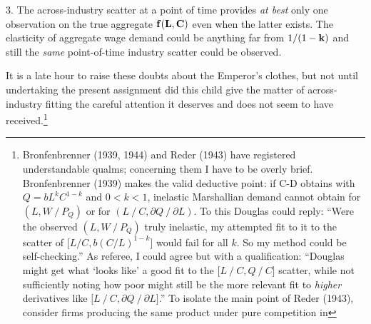 \documentclass{article}
\begin{document}
3. The across-industry scatter at a point of time provides \emph{at best} only one observation on the true aggregate \(\vb{f} (\vb{L},\vb{C})\) even when the latter exists. The elasticity of aggregate wage demand could be anything far from \(1/(1-\vb{k})\) and still the \emph{same} point-of-time industry scatter could be observed.

It is a late hour to raise these doubts about the Emperor's clothes, but not until undertaking the present assignment did this child give the matter of across-industry fitting the careful attention it deserves and does not seem to have received.\footnote{Bronfenbrenner (1939, 1944) and Reder (1943) have registered understandable qualms; concerning them I have to be overly brief. Bronfenbrenner (1939) makes the valid deductive point: if C-D obtains with \(Q=bL^k C^{1-k}\) and \(0<k<1\), inelastic Marshallian demand cannot obtain for \((L,W⁄P_Q)\) or for \((L⁄C,\partial Q⁄\partial L)\). To this Douglas could reply: ``Were the observed \((L,W⁄P_Q)\) truly inelastic, my attempted fit to it to the scatter of \(\lbrack L/C, b(C/L)^{1-k} \rbrack \) would fail for all \(k\). So my method could be self-checking.'' As referee, I could agree but with a qualification: ``Douglas might get what `looks like' a good fit to the \(\lbrack L⁄C,Q⁄C\rbrack\) scatter, while not sufficiently noting how poor might still be the more relevant fit to \emph{higher} derivatives like \(\lbrack L ⁄C,\partial Q⁄\partial L\rbrack\).'' To isolate the main point of Reder (1943), consider firms producing the same product under pure competition in
}
\end{document}
